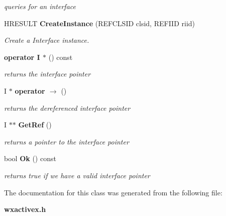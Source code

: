 \begin{CompactItemize}
\begin{CompactList}\small\item\em queries for an interface\item\end{CompactList}\item 
{}
HRESULT {\bf Create\-Instance} (REFCLSID clsid, REFIID riid)\label{classwxAutoOleInterface_a10}

\begin{CompactList}\small\item\em Create a Interface instance.\item\end{CompactList}\item 
{}
{\bf operator I $\ast$} () const\label{classwxAutoOleInterface_a11}

\begin{CompactList}\small\item\em returns the interface pointer\item\end{CompactList}\item 
{}
I $\ast$ {\bf operator $\rightarrow$ } ()\label{classwxAutoOleInterface_a12}

\begin{CompactList}\small\item\em returns the dereferenced interface pointer\item\end{CompactList}\item 
{}
I $\ast$$\ast$ {\bf Get\-Ref} ()\label{classwxAutoOleInterface_a13}

\begin{CompactList}\small\item\em returns a pointer to the interface pointer\item\end{CompactList}\item 
{}
bool {\bf Ok} () const\label{classwxAutoOleInterface_a14}

\begin{CompactList}\small\item\em returns true if we have a valid interface pointer\item\end{CompactList}\end{CompactItemize}


The documentation for this class was generated from the following file:\begin{CompactItemize}
\item 
{\bf wxactivex.h}\end{CompactItemize}
